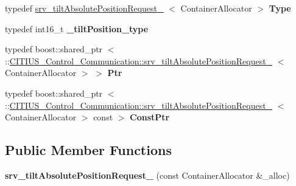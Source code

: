 \begin{DoxyCompactItemize}
\item 
\hypertarget{struct_c_i_t_i_u_s___control___communication_1_1srv__tilt_absolute_position_request___afb8e76abf65e9ced207590f974370566}{typedef \*
\hyperlink{struct_c_i_t_i_u_s___control___communication_1_1srv__tilt_absolute_position_request__}{srv\-\_\-tilt\-Absolute\-Position\-Request\-\_\-}\*
$<$ \-Container\-Allocator $>$ {\bfseries \-Type}}\label{struct_c_i_t_i_u_s___control___communication_1_1srv__tilt_absolute_position_request___afb8e76abf65e9ced207590f974370566}

\item 
\hypertarget{struct_c_i_t_i_u_s___control___communication_1_1srv__tilt_absolute_position_request___a47c5a6159fa6db5565176234d4b57cc0}{typedef int16\-\_\-t {\bfseries \-\_\-tilt\-Position\-\_\-type}}\label{struct_c_i_t_i_u_s___control___communication_1_1srv__tilt_absolute_position_request___a47c5a6159fa6db5565176234d4b57cc0}

\item 
\hypertarget{struct_c_i_t_i_u_s___control___communication_1_1srv__tilt_absolute_position_request___a95bfe3a794599d452c1c667f41f43f47}{typedef boost\-::shared\-\_\-ptr\*
$<$ \-::\hyperlink{struct_c_i_t_i_u_s___control___communication_1_1srv__tilt_absolute_position_request__}{\-C\-I\-T\-I\-U\-S\-\_\-\-Control\-\_\-\-Communication\-::srv\-\_\-tilt\-Absolute\-Position\-Request\-\_\-}\*
$<$ \-Container\-Allocator $>$ $>$ {\bfseries \-Ptr}}\label{struct_c_i_t_i_u_s___control___communication_1_1srv__tilt_absolute_position_request___a95bfe3a794599d452c1c667f41f43f47}

\item 
\hypertarget{struct_c_i_t_i_u_s___control___communication_1_1srv__tilt_absolute_position_request___a9e59814d8f067adf77a7e9cce56e1188}{typedef boost\-::shared\-\_\-ptr\*
$<$ \-::\hyperlink{struct_c_i_t_i_u_s___control___communication_1_1srv__tilt_absolute_position_request__}{\-C\-I\-T\-I\-U\-S\-\_\-\-Control\-\_\-\-Communication\-::srv\-\_\-tilt\-Absolute\-Position\-Request\-\_\-}\*
$<$ \-Container\-Allocator $>$ const  $>$ {\bfseries \-Const\-Ptr}}\label{struct_c_i_t_i_u_s___control___communication_1_1srv__tilt_absolute_position_request___a9e59814d8f067adf77a7e9cce56e1188}

\end{DoxyCompactItemize}
\subsection*{\-Public \-Member \-Functions}
\begin{DoxyCompactItemize}
\item 
\hypertarget{struct_c_i_t_i_u_s___control___communication_1_1srv__tilt_absolute_position_request___a405e599176701462c8458df74c852a97}{{\bfseries srv\-\_\-tilt\-Absolute\-Position\-Request\-\_\-} (const \-Container\-Allocator \&\-\_\-alloc)}\label{struct_c_i_t_i_u_s___control___communication_1_1srv__tilt_absolute_position_request___a405e599176701462c8458df74c852a97}

\end{DoxyCompactItemize}
